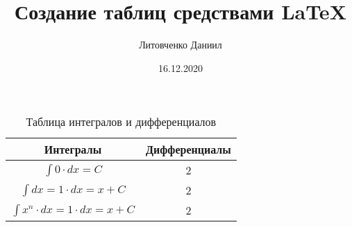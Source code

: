 \documentclass[a4paper,12pt]{article} %
\author{Литовченко Даниил}
\title{Создание таблиц средствами \LaTeX{}}
\date{16.12.2020}
\begin{document}

\maketitle
\newpage
\begin{table}
\caption{\label{tab:one}Таблица интегралов и дифференциалов}
\begin{center}
\begin{tabular}{|c|c|}
\hline 
Интегралы & Дифференциалы\\
\hline
$ \int{} 0 \cdot dx = C$  & 2\\
\hline
$ \int{} dx = 1\cdot dx = x + C$ & 2\\
\hline
$ \int{} x^n \cdot dx = 1\cdot dx = x + C$ & 2 \\
\hline
\end{tabular}
\end{center}
\end{table}
\end{document}
